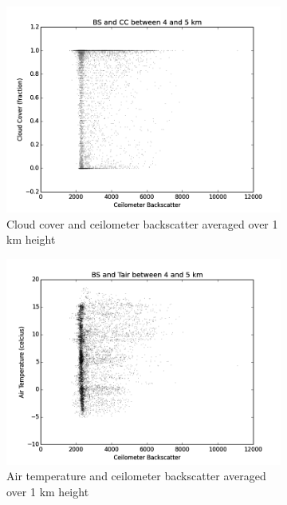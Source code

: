 \documentclass[a4paper,titlepage, twoside]{report}
\begin{document}
\begin{figure}
\centering
\begin{subfigure}{0.48\textwidth}
\includegraphics[width=\textwidth]{BS4_CC.png}
\caption{Cloud cover and ceilometer backscatter averaged over 1 km height}
\end{subfigure}
\hfill
\begin{subfigure}{0.48\textwidth}
\includegraphics[width=\textwidth]{BS4_Tair.png}
\caption{Air temperature and ceilometer backscatter averaged over 1 km height}
\end{subfigure}
\\
\begin{subfigure}{0.48\textwidth}

\end{subfigure}
\end{figure}
\end{document}
